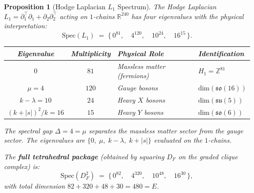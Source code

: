 \documentclass[12pt,a4paper]{article}
\newtheorem{proposition}[theorem]{Proposition}
\begin{document}
\begin{proposition}[Hodge Laplacian $L_1$ Spectrum]\label{prop:hodge-L1}
The Hodge Laplacian $L_1 = \partial_1^\top \partial_1 + \partial_2 \partial_2^\top$
acting on $1$-chains $\mathbb{R}^{240}$ has four eigenvalues with
the physical interpretation:
\[
  \mathrm{Spec}(L_1) \;=\;
  \bigl\{\,0^{81},\quad 4^{120},\quad 10^{24},\quad 16^{15}\,\bigr\}.
\]
\begin{center}
\renewcommand{\arraystretch}{1.3}
\begin{tabular}{@{}ccll@{}}
\toprule
Eigenvalue & Multiplicity & Physical Role & Identification \\
\midrule
$0$ & $81$ & Massless matter (fermions) & $H_1 = \mathbb{Z}^{81}$ \\
$\mu = 4$ & $120$ & Gauge bosons & $\mathrm{dim}(\mathfrak{so}(16))$ \\
$k - \lambda = 10$ & $24$ & Heavy $X$ bosons & $\mathrm{dim}(\mathfrak{su}(5))$ \\
$(k + |s|)^2/k = 16$ & $15$ & Heavy $Y$ bosons & $\mathrm{dim}(\mathfrak{so}(6))$ \\
\bottomrule
\end{tabular}
\end{center}
The spectral gap $\Delta = 4 = \mu$ separates the massless matter sector
from the gauge sector.  The eigenvalues are $\{0,\; \mu,\; k{-}\lambda,\; k{+}|s|\}$
evaluated on the $1$-chains.

The \textbf{full tetrahedral package} (obtained by squaring $D_F$ on
the graded clique complex) is:
\[
  \mathrm{Spec}(D_F^2) \;=\;
  \bigl\{\,0^{82},\quad 4^{320},\quad 10^{48},\quad 16^{30}\,\bigr\},
\]
with total dimension $82 + 320 + 48 + 30 = 480 = E$.
\end{proposition}
\end{document}
